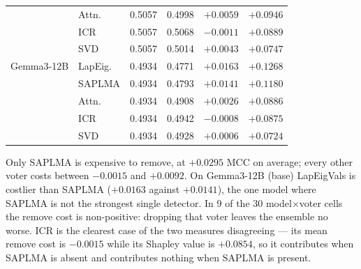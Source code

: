 \begin{table}[h]
\begin{tabular}{l l c c c c}
     & Attn. & 0.5057 & 0.4998 & $+0.0059$ & $+0.0946$ \\
     & ICR & 0.5057 & 0.5068 & $-0.0011$ & $+0.0889$ \\
     & SVD & 0.5057 & 0.5014 & $+0.0043$ & $+0.0747$ \\
    \hline
    Gemma3-12B & LapEig. & 0.4934 & 0.4771 & $+0.0163$ & $+0.1268$ \\
     & SAPLMA & 0.4934 & 0.4793 & $+0.0141$ & $+0.1180$ \\
     & Attn. & 0.4934 & 0.4908 & $+0.0026$ & $+0.0886$ \\
     & ICR & 0.4934 & 0.4942 & $-0.0008$ & $+0.0875$ \\
     & SVD & 0.4934 & 0.4928 & $+0.0006$ & $+0.0724$ \\
    \hline
  \end{tabular}
\end{table}

Only SAPLMA is expensive to remove, at $+0.0295$ MCC on average; every other
voter costs between $-0.0015$ and $+0.0092$. On Gemma3-12B (base) LapEigVals is costlier
than SAPLMA ($+0.0163$ against $+0.0141$), the one model where SAPLMA is not the strongest
single detector. In 9 of the 30 model$\times$voter cells the remove cost is
non-positive: dropping that voter leaves the ensemble no worse. ICR is the clearest case
of the two measures disagreeing --- its mean remove cost is $-0.0015$ while its Shapley
value is $+0.0854$, so it contributes when SAPLMA is absent and contributes nothing when
SAPLMA is present.
